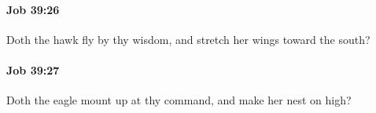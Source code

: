 		\paragraph{Job 39:26} %
			\label{JOB-39-26}

			Doth the hawk fly by thy wisdom, and stretch her wings toward the south?


		\paragraph{Job 39:27} %
			\label{JOB-39-27}

			Doth the eagle mount up at thy command, and make her nest on high?



